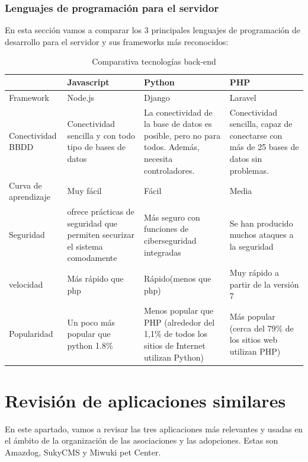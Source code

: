 \subsubsection{Lenguajes de programación para el servidor}
En esta sección vamos a comparar los 3 principales lenguajes de programación de desarrollo para el servidor y sus frameworks más reconocidos: 
\begin{table}[H] %
    \centering
    \begin{tabular}{|p{2cm} |p{3cm} |p{3cm} |p{3cm} |} \hline 
         &  \textbf{Javascript}&  \textbf{Python}& \textbf{PHP}\\  \hline 
         Framework &  Node.js &  Django & Laravel\\ \hline
         
        Conectividad BBDD &  Conectividad sencilla y con todo tipo de bases de datos&  La conectividad de la base de datos es posible, pero no para todos. Además, necesita controladores. & Conectividad sencilla, capaz de conectarse con más de 25 bases de datos sin problemas.\\ \hline 
        Curva de aprendizaje &  Muy fácil & Fácil & Media\\ \hline 
        Seguridad &  ofrece prácticas de seguridad que permiten securizar el sistema comodamente &  Más seguro con funciones de ciberseguridad integradas & Se han producido muchos ataques a la seguridad	\\ \hline 
        velocidad &  Más rápido que php &  Rápido(menos que php) & Muy rápido a partir de la versión 7\\ \hline 
        Popularidad & Un poco más popular que python 1.8\% &  Menos popular que PHP (alrededor del 1,1\% de todos los sitios de Internet utilizan Python) & Más popular (cerca del 79\% de los sitios web utilizan PHP)\\ \hline 
    \end{tabular}
    \caption{Comparativa tecnologías back-end }
    \label{tab:tec_back}
\end{table}

\pagebreak
\section{Revisión de aplicaciones similares} \label{appssimilares}

En este apartado, vamos a revisar las tres aplicaciones más relevantes y usadas en el ámbito de la organización de las asociaciones y las adopciones. Estas son Amazdog, SukyCMS y Miwuki pet Center.

